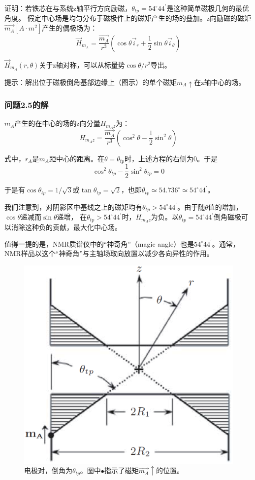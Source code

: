 证明：若铁芯在与系统z轴平行方向励磁，$\theta_{tp}=54^\circ 44^\prime$是这种简单磁极几何的最优角度。
假定中心场是均匀分布于磁极件上的磁矩产生的场的叠加。z向励磁的磁矩$\vec{m_A}[A\cdot m^2]$产生的偶极场为：
$$\vec{H}_{m_A}=\frac{\vec{m_A}}{r^3}(\cos\theta \vec{i}_r+\frac{1}{2}\sin\theta\vec{i}_\theta)$$

$\vec{H}_{m_A}(r,\theta)$关于z轴对称，可以从标量势$\cos\theta/r^2$导出。

提示：解出位于磁极倒角基部边缘上（图示）的单个磁矩$m_A \uparrow$在z轴中心的场。

\subsubsection*{问题2.5的解}

$m_A$产生的在中心的场的z向分量$H_{m_A z}$为：
$$H_{m_A z}=\frac{\vec{m_A}}{r^3}(\cos^2\theta-\frac{1}{2}\sin^2\theta)$$

式中，$r_A$是$m_A$距中心的距离。在$\theta=\theta_{tp}$时，上述方程的右侧为0。于是
$$\cos^2\theta_{tp}-\frac{1}{2}\sin^2\theta_{tp}=0$$

于是有$\cos\theta_{tp}=1/\sqrt{3}$或$\tan\theta_{tp}=\sqrt{2}$，也即$\theta_{tp}\simeq 54.736^\circ\simeq54^\circ 44^\prime$。

我们注意到，对阴影区中基线之上的磁矩均有$\theta_{tp}>54^\circ 44^\prime$。由于随$\theta$值的增加，$\cos\theta$递减而$\sin\theta$递增，
在$\theta_{tp}>54^\circ 44^\prime$时，$H_{m_A z}$为负。以$\theta_{tp}=54^\circ 44^\prime$倒角磁极可以消除这种负的贡献，最大化中心场。

值得一提的是，NMR质谱仪中的“神奇角”（magic angle）也是$54^\circ 44^\prime$。通常，NMR样品以这个“神奇角”与主轴场取向放置以减少各向异性的作用。

\begin{figure}
  \centering
 \includegraphics[scale=0.4]{chpt2/figs/fig2.8.eps}
  \caption{电极对，倒角为$\theta_{tp}$。图中$\bullet$指示了磁矩$\vec{m_A}\uparrow$的位置。}
\end{figure}


